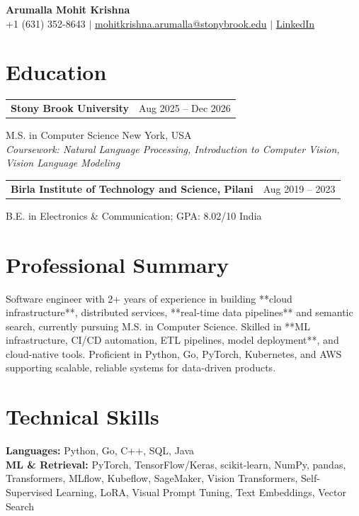 \documentclass[letterpaper,10pt]{article}
\makeatletter
\newcommand{\entry}[2]{%
  \noindent
  \begin{tabularx}{\linewidth}
    {@{}>{\raggedright\arraybackslash}X@{\hspace{6pt}}r@{}}
    \textbf{#1} & #2
  \end{tabularx}\par
}
\makeatother
\begin{document}
\begin{center}
    {\LARGE\bfseries Arumalla Mohit Krishna}\\[3pt]
    +1 (631) 352-8643 $|$
    \href{mailto:mohitkrishna.arumalla@stonybrook.edu}
    {mohitkrishna.arumalla@stonybrook.edu} $|$
    \href{https://linkedin.com/in/mohit-krishna-arumalla}
    {LinkedIn}
\end{center}
\vspace{-8pt}

\section{Education}

\entry
  {Stony Brook University}
  {Aug 2025 -- Dec 2026}

M.S. in Computer Science \hfill New York, USA\\
\textit{
Coursework: Natural Language Processing,
Introduction to Computer Vision, Vision Language Modeling
}
\vspace{3pt}

\entry
  {Birla Institute of Technology and Science, Pilani}
  {Aug 2019 -- 2023}

B.E. in Electronics \& Communication; GPA: 8.02/10 \hfill India

\section{Professional Summary}

Software engineer with 2+ years of experience in building **cloud infrastructure**, distributed services, **real-time data pipelines** and semantic search, currently pursuing M.S. in Computer Science. Skilled in **ML infrastructure, CI/CD automation, ETL pipelines, model deployment**, and cloud-native tools. Proficient in Python, Go, PyTorch, Kubernetes, and AWS supporting scalable, reliable systems for data-driven products.

\section{Technical Skills}

\textbf{Languages:}
Python, Go, C++, SQL, Java\\

\textbf{ML \& Retrieval:}
PyTorch, TensorFlow/Keras, scikit-learn, NumPy, pandas,
Transformers, MLflow, Kubeflow, SageMaker, Vision Transformers,
Self-Supervised Learning, LoRA, Visual Prompt Tuning,
Text Embeddings, Vector Search\\
\end{document}
